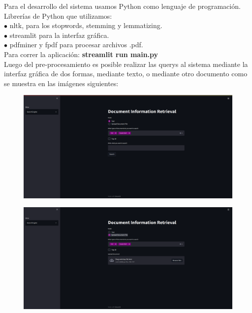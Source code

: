 \documentclass{llncs}
\begin{document}
Para el desarrollo del sistema usamos Python como lenguaje de programación. Librerías de Python
que utilizamos:\\

\noindent $\bullet$ nltk, para los stopwords, stemming y lemmatizing. \\
$\bullet$ streamlit para la interfaz gráfica. \\
$\bullet$ pdfminer y fpdf para procesar archivos .pdf.\\

Para correr la aplicación: {\bf streamlit run main.py} \\

Luego del pre-procesamiento es posible realizar las querys al sistema mediante la interfaz gráfica de dos formas,
mediante texto, o mediante otro documento como se muestra en las imágenes siguientes:

\begin{figure}[h]
    \includegraphics[scale = 0.3]{images/main_screen.png}
\end{figure}

\begin{figure}[h]
    \includegraphics[scale = 0.3]{images/main_upload_file.png}
\end{figure}
\end{document}
